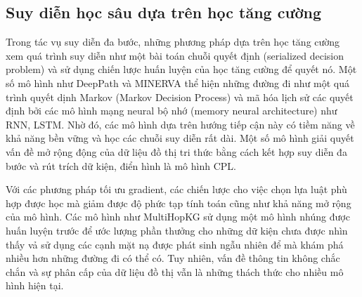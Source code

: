 \subsection{Suy diễn học sâu dựa trên học tăng cường}

Trong tác vụ suy diễn đa bước, những phương pháp dựa trên học tăng cường xem quá trình suy diễn như một bài toán chuỗi quyết định (serialized decision problem) và sử dụng chiến lược huấn luyện của học tăng cường để quyết nó.
Một số mô hình như DeepPath\cite{xiong2017deeppath} và MINERVA\cite{das2017go} thể hiện những đường đi như một quá trình quyết dịnh Markov (Markov Decision Process) và mã hóa lịch sử các quyết định bởi các mô hình mạng neural bộ nhớ (memory neural architecture) như RNN, 
LSTM. Nhờ đó, các mô hình dựa trên hướng tiếp cận này có tiềm năng về khả năng bền vững và học các chuỗi suy diễn rất dài. Một số mô hình giải quyết vấn đề mở rộng động của dữ liệu đồ thị tri thức bằng cách kết hợp suy diễn đa bước và rút trích
dữ kiện, điển hình là mô hình CPL\cite{fu2019collaborative}. 

Với các phương pháp tối ưu gradient, các chiến lược cho việc chọn lựa luật phù hợp được học mà giảm được độ phức tạp tính toán cũng như khả năng mở rộng của mô hình.
Các mô hình như MultiHopKG\cite{lin2018multi} sử dụng một mô hình nhúng được huấn luyện trước để ước lượng phần thưởng cho những dữ kiện chưa được nhìn thấy vả sử dụng các cạnh mặt nạ được phát sinh 
ngẫu nhiên để mà khám phá nhiều hơn những đường đi có thể có. Tuy nhiên, vấn đề thông tin không chắc chắn và sự phân cấp của dữ liệu đồ thị vẫn là những thách thức cho nhiều mô hình hiện tại.
